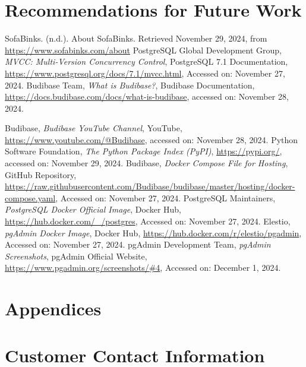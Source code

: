 \documentclass{article}
\begin{document}
\section{Recommendations for Future Work}

\clearpage
\begin{thebibliography}{99}
 SofaBinks. (n.d.). 
    About SofaBinks. Retrieved November 29, 2024, from \url{https://www.sofabinks.com/about}
 PostgreSQL Global Development Group, \textit{MVCC: Multi-Version Concurrency Control}, 
    PostgreSQL 7.1 Documentation, \url{https://www.postgresql.org/docs/7.1/mvcc.html}, Accessed on: November 27, 2024.
Budibase Team, 
\textit{What is Budibase?}, Budibase Documentation, 
\url{https://docs.budibase.com/docs/what-is-budibase}, 
accessed on: November 28, 2024.

Budibase, 
\textit{Budibase YouTube Channel}, YouTube, 
\url{https://www.youtube.com/@Budibase}, 
accessed on: November 28, 2024.
Python Software Foundation, 
\textit{The Python Package Index (PyPI)}, 
\url{https://pypi.org/}, 
accessed on: November 29, 2024.
 Budibase, \textit{Docker Compose File for Hosting}, 
GitHub Repository, \url{https://raw.githubusercontent.com/Budibase/budibase/master/hosting/docker-compose.yaml}, 
Accessed on: November 27, 2024.
 PostgreSQL Maintainers, 
\textit{PostgreSQL Docker Official Image}, Docker Hub, 
\url{https://hub.docker.com/_/postgres}, 
Accessed on: November 27, 2024.
 Elestio, 
\textit{pgAdmin Docker Image}, Docker Hub, 
\url{https://hub.docker.com/r/elestio/pgadmin}, 
Accessed on: November 27, 2024.
 pgAdmin Development Team, 
\textit{pgAdmin Screenshots}, pgAdmin Official Website, 
\url{https://www.pgadmin.org/screenshots/#4}, 
Accessed on: December 1, 2024.
\end{thebibliography}



\newpage
\section*{Appendices} %
\appendix
\section{Customer Contact Information}
\end{document}
